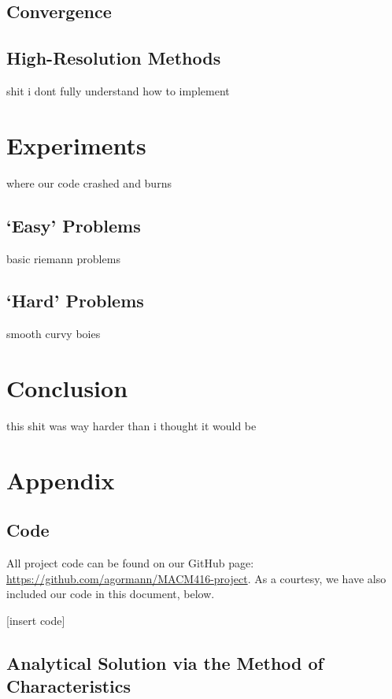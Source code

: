 \documentclass{myproject}
\begin{document}
\subsection{Convergence}



\subsection{High-Resolution Methods}

shit i dont fully understand how to implement

\section{Experiments}

where our code crashed and burns

\subsection{`Easy' Problems}

basic riemann problems

\subsection{`Hard' Problems}

smooth curvy boies

\section{Conclusion}

this shit was way harder than i thought it would be

\newpage
\appendix
\section{Appendix}
\subsection{Code}

All project code can be found on our GitHub page: \url{https://github.com/agormann/MACM416-project}. As a courtesy, we have also included our code in this document, below.

[insert code]

\subsection{Analytical Solution via the Method of Characteristics}
\end{document}
